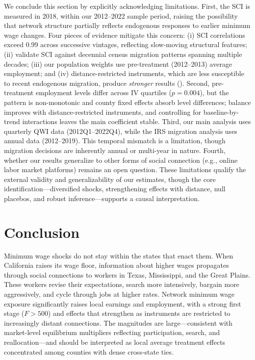 \documentclass[12pt]{article}
\begin{document}
We conclude this section by explicitly acknowledging limitations. First, the SCI is measured in 2018, within our 2012--2022 sample period, raising the possibility that network structure partially reflects endogenous responses to earlier minimum wage changes. Four pieces of evidence mitigate this concern: (i) SCI correlations exceed 0.99 across successive vintages, reflecting slow-moving structural features; (ii) \citet{bailey2020social} validate SCI against decennial census migration patterns spanning multiple decades; (iii) our population weights use pre-treatment (2012--2013) average employment; and (iv) distance-restricted instruments, which are less susceptible to recent endogenous migration, produce \textit{stronger} results (). Second, pre-treatment employment levels differ across IV quartiles ($p = 0.004$), but the pattern is non-monotonic and county fixed effects absorb level differences; balance improves with distance-restricted instruments, and controlling for baseline-by-trend interactions leaves the main coefficient stable. Third, our main analysis uses quarterly QWI data (2012Q1--2022Q4), while the IRS migration analysis uses annual data (2012--2019). This temporal mismatch is a limitation, though migration decisions are inherently annual or multi-year in nature. Fourth, whether our results generalize to other forms of social connection (e.g., online labor market platforms) remains an open question. These limitations qualify the external validity and generalizability of our estimates, though the core identification---diversified shocks, strengthening effects with distance, null placebos, and robust inference---supports a causal interpretation.


\section{Conclusion}
\label{sec:conclusion}

Minimum wage shocks do not stay within the states that enact them. When California raises its wage floor, information about higher wages propagates through social connections to workers in Texas, Mississippi, and the Great Plains. These workers revise their expectations, search more intensively, bargain more aggressively, and cycle through jobs at higher rates. Network minimum wage exposure significantly raises local earnings and employment, with a strong first stage ($F > 500$) and effects that strengthen as instruments are restricted to increasingly distant connections. The magnitudes are large---consistent with market-level equilibrium multipliers reflecting participation, search, and reallocation---and should be interpreted as local average treatment effects concentrated among counties with dense cross-state ties.
\end{document}
